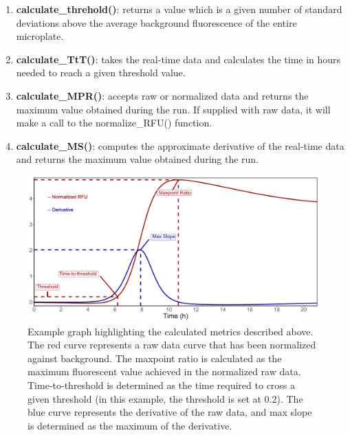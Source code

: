\documentclass[preprint,12pt,a4paper]{elsarticle}
\begin{document}
            \begin{enumerate}
                \item \textbf{calculate\_threhold()}: returns a value which is a given number of standard deviations above the average background fluorescence of the entire microplate.
                \item \textbf{calculate\_TtT()}: takes the real-time data and calculates the time in hours needed to reach a given threshold value.
                \item \textbf{calculate\_MPR()}: accepts raw or normalized data and returns the maximum value obtained during the run. If supplied with raw data, it will make a call to the normalize\_RFU() function.
                \item \textbf{calculate\_MS()}: computes the approximate derivative of the real-time data and returns the maximum value obtained during the run.
            \end{enumerate}

            \begin{figure}[ht]
                \centering{}
                \includegraphics[width=\textwidth]{images/metric_example.png}
                \caption{Example graph highlighting the calculated metrics described above. The red curve represents a raw data curve that has been normalized against background. The maxpoint ratio is calculated as the maximum fluorescent value achieved in the normalized raw data. Time‐to‐threshold is determined as the time required to cross a given threshold (in this example, the threshold is set at 0.2). The blue curve represents the derivative of the raw data, and max slope is determined as the maximum of the derivative.}
                \label{fig:metrics}
            \end{figure}
\end{document}
